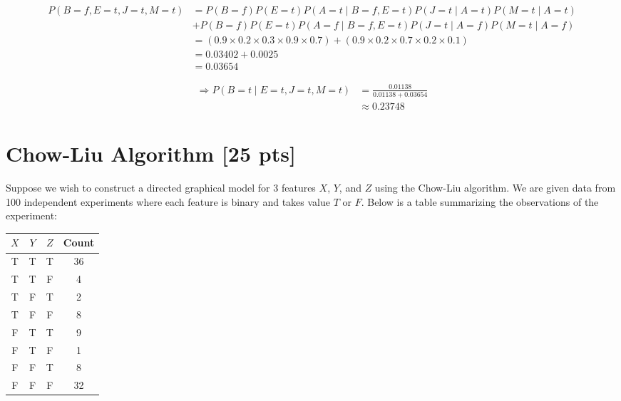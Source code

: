 \documentclass[a4paper]{article}
\theoremstyle{definition}
\newenvironment{soln}{
	\leavevmode\color{blue}\ignorespaces
}{}
\begin{document}
\begin{soln}
\begin{itemize}
		\begin{align*}
			P(B=f,E=t,J=t,M=t) &= P(B=f)P(E=t)P(A=t \mid B=f,E=t)P(J=t \mid A=t)P(M=t \mid A=t) \\
			&+ P(B=f)P(E=t)P(A=f \mid B=f,E=t)P(J=t \mid A=f)P(M=t \mid A=f) \\
			&= (0.9\times0.2\times0.3\times0.9\times0.7) + (0.9\times0.2\times0.7\times0.2\times0.1) \\
			&= 0.03402+ 0.0025\\
			&= 0.03654
		\end{align*}

		\begin{align*}
			\Rightarrow P(B=t \mid E=t,J=t,M=t) &= \frac{0.01138}{0.01138+ 0.03654} \\
			&\approx 0.23748
		\end{align*}
	\end{itemize}

\end{soln}


\section{Chow-Liu Algorithm [25 pts]}
Suppose we wish to construct a directed graphical model for 3 features $X$, $Y$, and $Z$ using the Chow-Liu algorithm. We are given data from 100 independent experiments where each feature is binary and takes value $T$ or $F$. Below is a table summarizing the observations of the experiment:

\begin{table}[H]
        \centering
                \begin{tabular}{cccc}
                           $X$ & $Y$ & $Z$ & Count \\
                                \hline
                                T & T & T & 36 \\
                                \hline
                                T & T & F & 4 \\
                                \hline
                                T & F & T & 2 \\
                                \hline
                                T & F & F & 8 \\
                                \hline
                                F & T & T & 9 \\
                                \hline
                                F & T & F & 1 \\
                                \hline
                                F & F & T & 8 \\
                                \hline
                                F & F & F & 32 \\
                                \hline
                \end{tabular}
\end{table}
\end{document}
